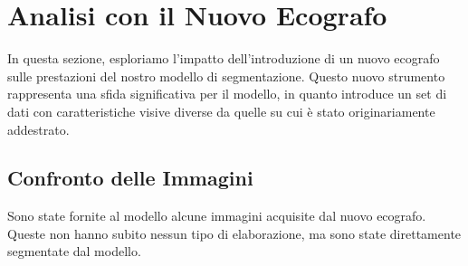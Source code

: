 \section{Analisi con il Nuovo Ecografo}
\label{sec:analisi_nuovo_ecografo}

In questa sezione, esploriamo l'impatto dell'introduzione di un nuovo ecografo sulle prestazioni del
nostro modello di segmentazione. Questo nuovo strumento rappresenta una sfida significativa per il
modello, in quanto introduce un set di dati con caratteristiche visive diverse da quelle su cui è
stato originariamente addestrato.

\subsection{Confronto delle Immagini}
\label{subsec:confronto_immagini}

Sono state fornite al modello alcune immagini acquisite dal nuovo ecografo. Queste non hanno subito
nessun tipo di elaborazione, ma sono state direttamente segmentate dal modello.


%
%

